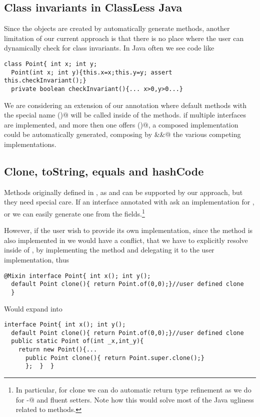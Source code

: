 \subsection{Class invariants in ClassLess Java}
Since the objects are created by automatically generate methods,
another limitation of our current approach is that there is no place where the user can dynamically check for class invariants.
In Java often we see code like
\begin{lstlisting}
class Point{ int x; int y;
  Point(int x; int y){this.x=x;this.y=y; assert this.checkInvariant();}
  private boolean checkInvariant(){... x>0,y>0...}
\end{lstlisting} 

We are considering an extension of our annotation where 
default methods with the special name \Q@checkInvariant()@ will be called inside of the \Q@of@ methods.
if multiple interfaces are implemented, and more then one offers
\Q@checkInvariant()@,  a composed implementation could be automatically generated, composing by \Q@&&@ the various competing implementations.

\subsection{Clone, toString, equals and hashCode}
Methods originally defined in \Q@Object@, as \Q@clone@ and \Q@toString@ can be supported by our approach, but they need special care. If an interface annotated with \mixin ask an implementation for \Q@clone@, \Q@toString@ \Q@equls@ or \Q@hashCode@ we can easily generate one from the fields.\footnote{In particular, for clone we can do automatic return type refinement as we do for \Q@with-@ and fluent setters. Note how this would solve most of the Java ugliness related to \Q@clone@ methods.}

However, if the user wish to provide its own implementation, since the method is also implemented in \Q@Object@ we would have a conflict, that we have to explicitly resolve inside of \Q@of@, by implementing the method and delegating it to the user implementation, thus

\begin{lstlisting}
@Mixin interface Point{ int x(); int y();
  default Point clone(){ return Point.of(0,0);}//user defined clone
  }
\end{lstlisting} 
Would expand into 

\begin{lstlisting}
interface Point{ int x(); int y();
  default Point clone(){ return Point.of(0,0);}//user defined clone
  public static Point of(int _x,int_y){
    return new Point(){...
      public Point clone(){ return Point.super.clone();}
      };  }  }
\end{lstlisting} 
